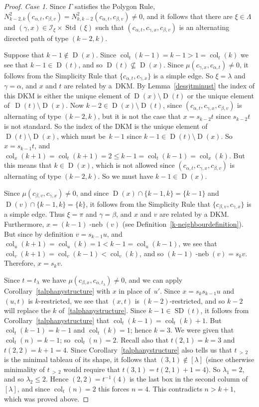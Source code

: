 \documentclass[10pt]{amsart}
\theoremstyle{definition}
\newenvironment{Case}[1]{\smallskip\noindent\emph{Case #1}\endgraf
 \nobreak\noindent\ignorespaces}{\endgraf\smallskip}
\DeclareMathOperator{\col}{col}
\newcommand{\morethan}[2]{#1\,{_{>\,#2}}}
\DeclareMathOperator{\STD}{Std}
\DeclareMathOperator{\neb}{-neb}
\DeclareMathOperator{\SD}{SD}
\DeclareMathOperator{\D}{D}
\begin{document}
\begin{proof}
\begin{Case}{1.}
Since $\Gamma$ satisfies the
Polygon Rule,
$N^{2}_{k-2,k}(c_{\alpha,t},c_{\beta,v})=N^{2}_{k,k-2}(c_{\alpha,t},c_{\beta,v})\ne 0$,
and it follows that there are $\xi\in\Lambda$ and $(\gamma,x)\in\mathcal{I}_{\xi}\times\STD(\xi)$
such that $(c_{\alpha,t},c_{\gamma,x},c_{\beta,v})$
is an alternating directed path of type $(k-2,k)$.

Suppose that $k-1\notin\D(x)$. Since $\col_t(k-1)=k-1>1=\col_t(k)$ we see that
$k-1\in\D(t)$, and so $\D(t)\nsubseteq\D(x)$. Since $\mu(c_{\gamma,x},c_{\alpha,t})\ne0$,
it follows from the Simplicity Rule that $\{c_{\alpha,t},c_{\gamma,x}\}$ is a simple edge.
So $\xi=\lambda$ and $\gamma=\alpha$, and $x$ and $t$ are related by a~DKM.
By Lemma~\ref{dessjtminust} the index of this DKM is either the unique element
of $\D(x)\setminus\D(t)$ or the unique element of~$\D(t)\setminus\D(x)$. Now
$k-2\in\D(x)\setminus\D(t)$, since $(c_{\alpha,t},c_{\gamma,x},c_{\beta,v})$ is
alternating of type $(k-2,k)$, but it is not the case that $x=s_{k-2}t$ since
$s_{k-2}t$ is not standard. So the index of the DKM is the unique element of
$\D(t)\setminus\D(x)$, which must be~$k-1$ since $k-1\in\D(t)\setminus\D(x)$.
So $x=s_{k-1}t$,
and $\col_x(k+1)=\col_t(k+1)=2\leq k-1=\col_t(k-1)=\col_x(k)$. But this means that
$k\in\D(x)$, which is not allowed since $(c_{\alpha,t},c_{\gamma,x},c_{\beta,v})$ is
alternating of type $(k-2,k)$. So we must have $k-1\in\D(x)$.

Since $\mu(c_{\beta,v},c_{\gamma,x})\neq 0$, and since
$\D(x)\cap\{k-1,k\}=\{k-1\}$ and $\D(v)\cap\{k-1,k\}=\{k\}$, it follows from
the Simplicity Rule that $\{c_{\beta,v},c_{\gamma,x}\}$ is a
simple edge. Thus $\xi=\pi$ and $\gamma=\beta$, and $x$ and $v$
are related by a DKM. Furthermore, $x=(k-1)\neb(v)$
(see Definition~\ref{k-neighbourdefinition}). But since by definition
$v=s_{k-1}u$, and $\col_u(k+1)=\col_u(k)=1<k-1=\col_u(k-1)$, we see that
$\col_v(k+1)=\col_v(k-1)<\col_v(k)$, and so $(k-1)\neb(v)=s_kv$.
Therefore, $x=s_kv$.

Since $t=t_\lambda$ we have $\mu(c_{\beta,x},c_{\alpha,t_\lambda})\ne0$, and we
can apply Corollary~\ref{talphanystructure} with $x$ in place of~$u'$.
Since $x=s_ks_{k-1}u$ and $(u,t)$ is $k$-restricted, we see that $(x,t)$
is $(k-2)$-restricted, and so $k-2$ will replace the $k$ of~\ref{talphanystructure}.
Since $k-1\in\SD(t)$, it follows from Corollary~\ref{talphanystructure} that
$\col_t(k-1)=\col_t(k)+1$. But $\col_t(k-1)=k-1$ and $\col_t(k)=1$; hence
$k=3$. We were given that $\col_t(n)=k-1$; so $\col_t(n)=2$.
Recall also that $t(2,1)=k=3$ and $t(2,2)=k+1=4$. Since Corollary~\ref{talphanystructure}
also tells us that $\morethan t2$ is the minimal tableau of its shape,
it follows that $(3,1)\notin[\lambda]$ (since otherwise minimality of
$\morethan t2$ would require that $t(3,1)=t(2,1)+1=4$). So $\lambda_1=2$,
and so $\lambda_2\leqslant 2$.
Hence $(2,2)=t^{-1}(4)$ is the last box in the second column of~$[\lambda]$,
and since $\col_t(n)=2$ this forces $n=4$. This contradicts $n>k+1$,
which was proved above.
\end{Case}


\end{proof}
\end{document}
